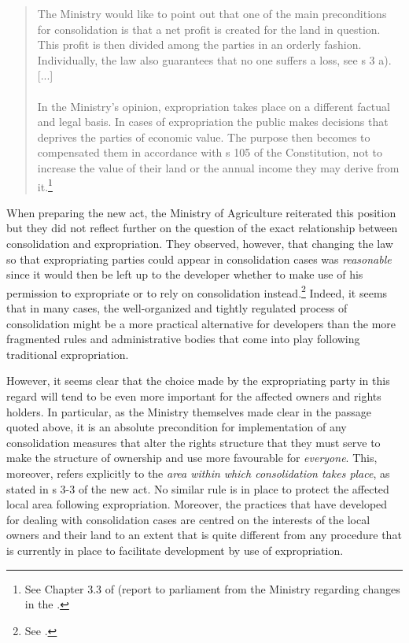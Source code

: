 \begin{quote}
The Ministry would like to point out that one of the main preconditions for consolidation is that a net profit is created for the land in question. This profit is then divided among the parties in an orderly fashion. Individually, the law also guarantees that no one suffers a loss, see s 3 a). [...] \\ \\ In the Ministry's opinion, expropriation takes place on a different factual and legal basis. In cases of expropriation the public makes decisions that deprives the parties of economic value. The purpose then becomes to compensated them in accordance with s 105 of the Constitution, not to increase the value of their land or the annual income they may derive from it.\footnote{See Chapter 3.3 of \cite{otprp78} (report to parliament from the Ministry regarding changes in the \cite{lca79}.}
\end{quote}

When preparing the new act, the Ministry of Agriculture reiterated this position but they did not reflect further on the question of the exact relationship between consolidation and expropriation. They observed, however, that changing the law so that expropriating parties could appear in consolidation cases was \emph{reasonable} since it would then be left up to the developer whether to make use of his permission to expropriate or to rely on consolidation instead.\footnote{See \cite[84]{prop12}.} Indeed, it seems that in many cases, the well-organized and tightly regulated process of consolidation might be a more practical alternative for developers than the more fragmented rules and administrative bodies that come into play following traditional expropriation. 

However, it seems clear that the choice made by the expropriating party in this regard will tend to be even more important for the affected owners and rights holders. In particular, as the Ministry themselves made clear in the passage quoted above, it is an absolute precondition for implementation of any consolidation measures that alter the rights structure that they must serve to make the structure of ownership and use more favourable for \emph{everyone}. This, moreover, refers explicitly to the \emph{area within which consolidation takes place}, as stated in s 3-3 of the new act. No similar rule is in place to protect the affected local area following expropriation. Moreover, the practices that have developed for dealing with consolidation cases are centred on the interests of the local owners and their land to an extent that is quite different from any procedure that is currently in place to facilitate development by use of expropriation.

